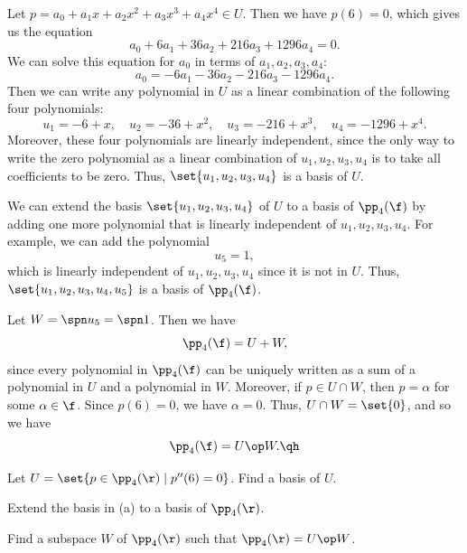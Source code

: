 \begin{sole}
    \item Let $p = a_0 + a_1 x + a_2 x^2 + a_3 x^3 + a_4 x^4 \in U$. Then we have $p(6) = 0$, which gives us the equation
    \[a_0 + 6a_1 + 36a_2 + 216a_3 + 1296a_4 = 0.\]
    We can solve this equation for $a_0$ in terms of $a_1, a_2, a_3, a_4$:
    \[a_0 = -6a_1 - 36a_2 - 216a_3 - 1296a_4.\]
    Then we can write any polynomial in $U$ as a linear combination of the following four polynomials:
    \[u_1 = -6 + x, \quad u_2 = -36 + x^2, \quad u_3 = -216 + x^3, \quad u_4 = -1296 + x^4.\]
    Moreover, these four polynomials are linearly independent, since the only way to write the zero polynomial as a linear combination of $u_1, u_2, u_3, u_4$ is to take all coefficients to be zero. Thus, $\set{u_1, u_2, u_3, u_4}$ is a basis of $U$.
    \item We can extend the basis $\set{u_1, u_2, u_3, u_4}$ of $U$ to a basis of $\pp_4(\f)$ by adding one more polynomial that is linearly independent of $u_1, u_2, u_3, u_4$. For example, we can add the polynomial
    \[u_5 = 1,\]
    which is linearly independent of $u_1, u_2, u_3, u_4$ since it is not in $U$. Thus, $\set{u_1, u_2, u_3, u_4, u_5}$ is a basis of $\pp_4(\f)$.
    \item Let $W = \spn u_5 = \spn 1$. Then we have
    \[\pp_4(\f) = U + W,\]
    since every polynomial in $\pp_4(\f)$ can be uniquely written as a sum of a polynomial in $U$ and a polynomial in $W$. Moreover, if $p \in U \cap W$, then $p = \alpha$ for some $\alpha \in \f$. Since $p(6) = 0$, we have $\alpha = 0$. Thus, $U \cap W = \set{0}$, and so we have
    \[\pp_4(\f) = U \op W. \qh\]
\end{sole}

\begin{exercise}[2c4]
    \begin{subexercises}
        \item Let $U = \set{p \in \pp_4(\r) \mid p''(6) = 0}$. Find a basis of $U$.
        \item Extend the basis in (a) to a basis of $\pp_4(\r)$.
        \item Find a subspace $W$ of $\pp_4(\r)$ such that $\pp_4(\r) = U \op W$.
    \end{subexercises}
\end{exercise}

